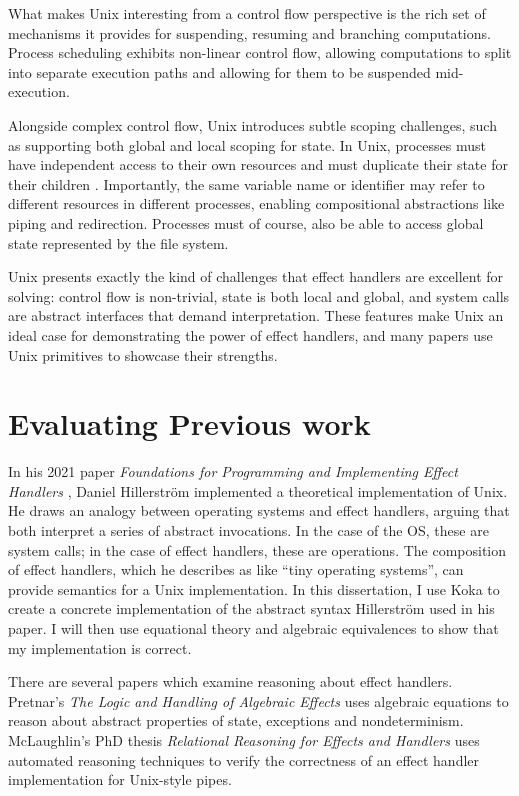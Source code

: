 \documentclass[logo,bsc,singlespacing,parskip]{infthesis}
\begin{document}
What makes Unix interesting from a control flow perspective is the rich set of mechanisms it provides for suspending, resuming and branching computations\cite{stevens2013advanced}. Process scheduling exhibits non-linear control flow, allowing computations to split into separate execution paths and allowing for them to be suspended mid-execution.

Alongside complex control flow, Unix introduces subtle scoping challenges, such as supporting both global and local scoping for state. In Unix, processes must have independent access to their own resources and must duplicate their state for their children \cite{aiken2006deconstructing}. Importantly, the same variable name or identifier may refer to different resources in different processes, enabling compositional abstractions like piping and redirection. Processes must of course, also be able to access global state represented by the file system.

Unix presents exactly the kind of challenges that effect handlers are excellent for solving: control flow is non-trivial, state is both local and global, and system calls are abstract interfaces that demand interpretation. These features make Unix an ideal case for demonstrating the power of effect handlers, and many papers use Unix primitives to showcase their strengths.


\section{Evaluating Previous work}
In his 2021 paper \textit{Foundations for Programming and Implementing Effect Handlers} \cite{hillerstrom_foundations_nodate}, Daniel Hillerström implemented a theoretical implementation of Unix. He draws an analogy between operating systems and effect handlers, arguing that both interpret a series of abstract invocations. In the case of the OS, these are system calls; in the case of effect handlers, these are operations. The composition of effect handlers, which he describes as like “tiny operating systems”, can provide semantics for a Unix implementation. In this dissertation, I use Koka to create a concrete implementation of the abstract syntax Hillerström used in his paper. I will then use equational theory and algebraic equivalences to show that my implementation is correct.

There are several papers which examine reasoning about effect handlers. Pretnar's \textit{The Logic and Handling of Algebraic Effects} \cite{Pretnar:2010} uses algebraic equations to reason about abstract properties of state, exceptions and nondeterminism. McLaughlin's PhD thesis \textit{Relational Reasoning for Effects and Handlers} \cite{McLaughlin2020} uses automated reasoning techniques to verify the correctness of an effect handler implementation for Unix-style pipes. 
\end{document}
